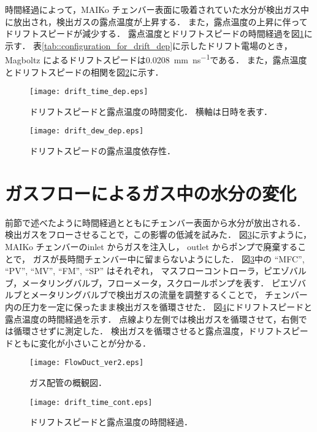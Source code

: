 \documentclass[../master]{subfiles}
\begin{document}
時間経過によって，MAIKo チェンバー表面に吸着されていた水分が検出ガス中に放出され，検出ガスの露点温度が上昇する．
また，露点温度の上昇に伴ってドリフトスピードが減少する．
露点温度とドリフトスピードの時間経過を図\ref{fig::drift_time_dep}に示す．
表\ref{tab::configuration_for_drift_dep}に示したドリフト電場のとき，
Magboltz によるドリフトスピードは\SI{0.0208}{\milli\metre\per\nano\second}である．
また，露点温度とドリフトスピードの相関を図\ref{fig::drift_dew_dep}に示す．
\begin{figure}
  \centering
  \texttt{[image: drift\_time\_dep.eps]}
  \caption[ドリフトスピードと露点温度の時間変化．]
          {ドリフトスピードと露点温度の時間変化．
          横軸は日時を表す．}
  \label{fig::drift_time_dep}
\end{figure}
\begin{figure}
  \centering
  \texttt{[image: drift\_dew\_dep.eps]}
  \caption{ドリフトスピードの露点温度依存性．}
  \label{fig::drift_dew_dep}
\end{figure}

\section{ガスフローによるガス中の水分の変化}
前節で述べたように時間経過とともにチェンバー表面から水分が放出される．
検出ガスをフローさせることで，この影響の低減を試みた．
図\ref{fig::gas_duct}に示すように，MAIKo チェンバーのinlet からガスを注入し，
outlet からポンプで廃棄することで，
ガスが長時間チェンバー中に留まらないようにした．
図\ref{fig::gas_duct}中の ``MFC'', ``PV'', ``MV'', ``FM'', ``SP'' はそれぞれ，
マスフローコントローラ，ピエゾバルブ，メータリングバルブ，フローメータ，スクロールポンプを表す．
ピエゾバルブとメータリングバルブで検出ガスの流量を調整するくことで，
チェンバー内の圧力を一定に保ったまま検出ガスを循環させた．
図\ref{fig::drift_time_cont}にドリフトスピードと露点温度の時間経過を示す．
点線より左側では検出ガスを循環させて，右側では循環させずに測定した．
検出ガスを循環させると露点温度，ドリフトスピードともに変化が小さいことが分かる．
\begin{figure}
  \centering
  \texttt{[image: FlowDuct\_ver2.eps]}
  \caption{ガス配管の概観図．}
  \label{fig::gas_duct}
\end{figure}
\begin{figure}
  \centering
  \texttt{[image: drift\_time\_cont.eps]}
  \caption{ドリフトスピードと露点温度の時間経過．}
  \label{fig::drift_time_cont}
\end{figure}
\end{document}
